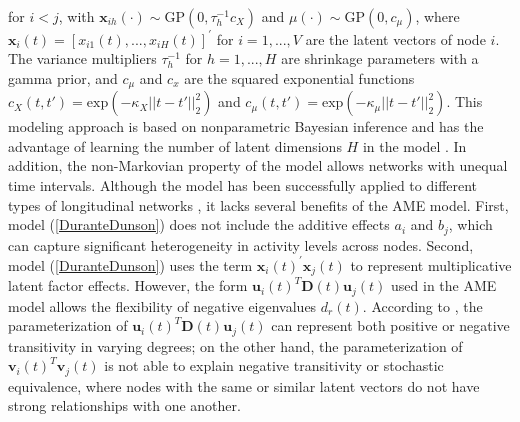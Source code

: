 \documentclass[a4paper]{article}
\begin{document}
		for $i<j$, with $\boldsymbol{x}_{ih}(\cdot) \sim \mbox{GP}(0, \tau_h^{-1}c_X)$ and $\mu(\cdot) \sim \mbox{GP}(0, c_\mu)$,
		where $\boldsymbol{x}_i(t)=[x_{i1}(t),...,x_{iH}(t)]^\prime$ for $i = 1,...,V$ are the latent vectors of node $i$. The variance multipliers $\tau_h^{-1}$ for $h=1,...,H$ are shrinkage parameters with a gamma prior, and $c_\mu$ and $c_x$ are the squared exponential functions $c_X(t, t') = \mbox{exp}(-\kappa_X||t-t'||_2^2)$ and $c_\mu(t, t') = \mbox{exp}(-\kappa_\mu||t-t'||_2^2)$. This modeling approach is based on nonparametric Bayesian inference and has the advantage of learning the number of latent dimensions $H$ in the model \citep{bhattacharya2011sparse}. In addition, the non-Markovian property of the model allows networks with unequal time intervals. Although the model has been successfully applied to different types of longitudinal networks \citep{durante2014bayesian2,durante2014bayesian}, it lacks several benefits of the AME model. First, model (\ref{DuranteDunson}) does not include the additive effects $a_i$ and $b_j$, which can capture significant heterogeneity in activity levels across nodes. Second, model (\ref{DuranteDunson}) uses the term $\boldsymbol{x}_i(t)^\prime \boldsymbol{x}_j(t)$ to represent multiplicative latent factor effects. However, the form $\boldsymbol{u}_i(t)^T\mathbf{D}(t)\boldsymbol{u}_j(t)$ used in the AME model allows the flexibility of negative eigenvalues $d_r(t)$. According to \cite{hoff2008modeling}, the parameterization of $\boldsymbol{u}_i(t)^T\mathbf{D}(t)\boldsymbol{u}_j(t)$ can represent both positive or negative transitivity in varying degrees; on the other hand, the parameterization of $\boldsymbol{v}_i(t)^T\boldsymbol{v}_j(t)$ is not able to explain negative transitivity or stochastic equivalence, where nodes with the same or similar latent vectors do not have strong relationships with one another.\\ \newline
\end{document}
